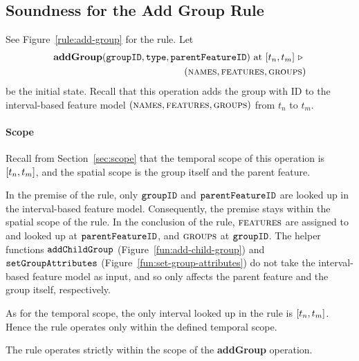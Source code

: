 
\subsection{Soundness for the Add Group Rule}
\label{sub:soundness-for-the-add-group-rule}

See Figure~\vref{rule:add-group} for the  rule. 
Let 
\begin{equation*}
   \begin{split}
      \textbf{addGroup}(\var{groupID}, \var{type}, \var{parentFeatureID})\text{ at }\interval{t_n}{t_m}
      \shove \\
   (\names{}, \features{}, \groups{})
\end{split}
\end{equation*}
be the initial state. Recall that this operation adds the group with ID  to the interval-based feature model $(\textsc{names}{}, \textsc{features}{}, \textsc{groups}{}{})$ from $t_n$ to $t_m$. 

\paragraph{Scope}

Recall from Section~\vref{sec:scope} that the temporal scope of this operation is $\interval{t_n}{t_m}$, and the spatial scope is the group itself and the parent feature.

In the premise of the rule, only $\texttt{groupID}$ and $\texttt{parentFeatureID}$ are looked up in the interval-based feature model. Consequently, the premise stays within the spatial scope of the rule. In the conclusion of the rule, $\textsc{features}{}$ are assigned to and looked up at $\texttt{parentFeatureID}$, and $\textsc{groups}{}{}$ at $\texttt{groupID}$. The helper functions $\texttt{addChildGroup}$ (Figure~\vref{fun:add-child-group}) and $\texttt{setGroupAttributes}$ (Figure~\vref{fun:set-group-attributes}) do not take the interval-based feature model as input, and so only affects the parent feature and the group itself, respectively.

As for the temporal scope, the only interval looked up in the rule is $\interval{t_n}{t_m}$. Hence the rule operates only within the defined temporal scope.
\\

\begin{lemma}
   The  rule operates strictly within the scope of the \textbf{addGroup} operation.
   \label{lemma:add-group-scope}
\end{lemma}

